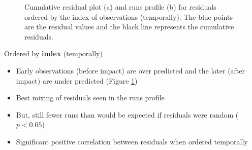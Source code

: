 \begin{frame}[fragile]
\begin{figure}[h!]
  \centering
  \caption{Cumulative residual plot (a) and runs profile (b) for residuals ordered by the index of observations (temporally).  The blue points are the residual values and the black line represents the cumulative residuals.}
  \label{fig:geeruns3}
\end{figure}
\end{frame}

\begin{frame}[fragile]
Ordered by \textbf{index} (temporally)
\begin{itemize}
\item Early observations (before impact) are over predicted and the later (after impact) are under predicted (Figure \ref{fig:geeruns3})
\item Best mixing of residuals seen in the runs profile 
\item But, still fewer runs than would be expected if residuals were random ($p<0.05$)
\item Significant positive correlation between residuals when ordered temporally
\end{itemize}
\end{frame}

